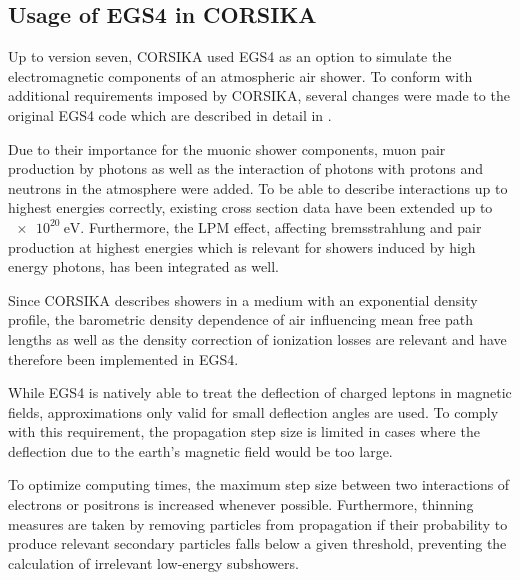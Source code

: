 \subsection{Usage of EGS4 in CORSIKA}

Up to version seven, CORSIKA used EGS4 as an option to simulate the electromagnetic components of an atmospheric air shower.
To conform with additional requirements imposed by CORSIKA, several changes were made to the original EGS4 code which are described in detail in \cite{corsika_physics}.

Due to their importance for the muonic shower components, muon pair production by photons as well as the interaction of photons with protons and neutrons in the atmosphere were added.
To be able to describe interactions up to highest energies correctly, existing cross section data have been extended up to $\SI{e20}{\electronvolt}$.
Furthermore, the LPM effect, affecting bremsstrahlung and pair production at highest energies which is relevant for showers induced by high energy photons, has been integrated as well.

Since CORSIKA describes showers in a medium with an exponential density profile, the barometric density dependence of air influencing mean free path lengths as well as the density correction of ionization losses are relevant and have therefore been implemented in EGS4.

While EGS4 is natively able to treat the deflection of charged leptons in magnetic fields, approximations only valid for small deflection angles are used.
To comply with this requirement, the propagation step size is limited in cases where the deflection due to the earth's magnetic field would be too large.

To optimize computing times, the maximum step size between two interactions of electrons or positrons is increased whenever possible.
Furthermore, thinning measures are taken by removing particles from propagation if their probability to produce relevant secondary particles falls below a given threshold, preventing the calculation of irrelevant low-energy subshowers.